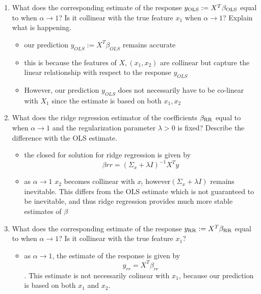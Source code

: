 \documentclass[12pt,twoside]{article}
\begin{document}
\begin{enumerate}
\begin{enumerate}
\begin{itemize}
\end{itemize}
   \item  What does the corresponding estimate of the response $y_{\operatorname{OLS}} := X^T\beta_{\operatorname{OLS}}$ equal to when $\alpha \rightarrow 1$? Is it collinear with the true feature $x_1$ when $\alpha \rightarrow 1$? Explain what is happening.
\begin{itemize}
    \color{blue}
    \item our prediction $y_{OLS} := X^T \beta_{OLS}$ remains accurate
    \item this is because the features of $X, (x_1,x_2)$ are collinear but capture the linear relationship with respect to the response $y_{OLS}$
    \item However, our prediction $y_{OLS}$ does not necessarily have to be co-linear with $X_1$ since the estimate is based on both $x_1,x_2$
\end{itemize}
   
  \item What does the ridge regression estimator of the coefficients $\beta_{\operatorname{RR}}$ equal to when $\alpha \rightarrow 1$ and the regularization parameter $\lambda >0$ is fixed? Describe the difference with the OLS estimate.
\begin{itemize}
   \color{purple}
    \item the closed for solution for ridge regression is given by $$\beta{rr}=(\Sigma_{x}+\lambda I)^{-1}X^Ty$$
\item as $\alpha \rightarrow 1$ $x_2$ becomes collinear with $x_!$ however$ (\Sigma_{x}+\lambda I)$ remains inevitable. 
\itme This differs from the OLS estimate which is not guaranteed to be inevitable, and thus ridge regression provides much more stable estimates of $\beta$
\end{itemize}

  
  \item  What does the corresponding estimate of the response $y_{\operatorname{RR}} := X^T\beta_{\operatorname{RR}}$ equal to when $\alpha \rightarrow 1$? Is it collinear with the true feature $x_1$?

  \begin{itemize}
      \color{orange}
      \item as $\alpha \rightarrow 1$, the estimate of the response  is given by $$y_{rr} = X^T \beta_{rr}$$. This estimate is not necessarily colinear with $x_1$, because our prediction is based on both $x_1$ and $x_2$.
  \end{itemize}
  \end{enumerate} 
  

\end{enumerate}
\end{document}
